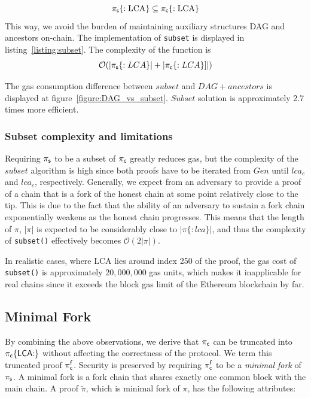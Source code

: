 \[ \mathsf{\pi_{s}}\{:\textrm{LCA}\} \subseteq \mathsf{\pi_{c}}\{:\textrm{LCA}\} \]
This way, we avoid the burden of maintaining auxiliary structures DAG and
ancestors on-chain. The implementation of \texttt{subset} is displayed in
listing~\ref{listing:subset}. The complexity of the function is \[
\mathcal{O}(|\mathsf{\pi_{s}}\{:LCA\}| + |\mathsf{\pi_{c}}\{:LCA\}]|) \]





The gas consumption difference between $subset$ and $DAG+ancestors$ is
displayed at figure~\ref{figure:DAG_vs_subset}. $Subset$ solution is
approximately 2.7 times more efficient.



\subsubsection{Subset complexity and limitations}

Requiring $\mathsf{\pi_{s}}$ to be a subset of $\mathsf{\pi_{c}}$ greatly reduces gas, but
the complexity of the $subset$ algorithm is high since both proofs have to be
iterated from $Gen$ until $lca_e$ and $lca_c$, respectively. Generally, we
expect from an adversary to provide a proof of a chain that is a fork of the
honest chain at some point relatively close to the tip. This is due to the fact
that the ability of an adversary to sustain a fork chain exponentially weakens
as the honest chain progresses. This means that the length of $\pi$, $|\pi|$ is
expected to be considerably close to $|\pi\{{:}lca\}|$, and thus the complexity of
\texttt{subset()} effectively becomes $\mathcal{O}(2|\pi|)$.

In realistic cases, where LCA lies around index 250 of the proof, the gas cost
of \texttt{subset()} is approximately $20{,}000{,}000$ gas units, which makes it
inapplicable for real chains since it exceeds the block gas limit of the
Ethereum blockchain by far.

\subsection{Minimal Fork} By combining the above observations, we
derive that $\mathsf{\pi_{c}}$ can be truncated into $\mathsf{\pi_{c}}\{\mathsf{LCA}{:}\}$ without affecting
the correctness of the protocol. We term this truncated proof $\mathsf{\pi_{c}^{f}}$.
Security is preserved by requiring $\mathsf{\pi_{c}^{f}}$ to be a \emph{minimal fork} of
$\mathsf{\pi_{s}}$. A minimal fork is a fork chain that shares exactly one common block
with the main chain. A proof $\tilde\pi$, which is minimal fork of $\pi$, has
the following attributes:

